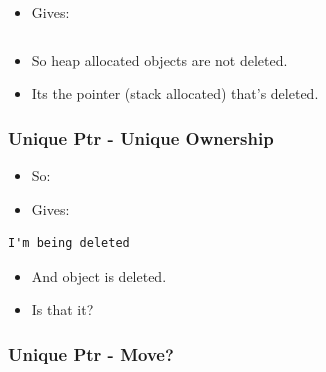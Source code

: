 \begin{itemize}
\itemsep1pt\parskip0pt
\item
  Gives:
\end{itemize}

\begin{verbatim}
\end{verbatim}

\begin{itemize}
\itemsep1pt\parskip0pt
\item
  So heap allocated objects are not deleted.
\item
  Its the pointer (stack allocated) that's deleted.
\end{itemize}

\subsubsection{Unique Ptr - Unique
Ownership}\label{unique-ptr---unique-ownership}

\begin{itemize}
\itemsep1pt\parskip0pt
\item
  So:
\end{itemize}

\begin{Shaded}
\begin{Highlighting}[]
 
   \NormalTok{,}\NormalTok{));}
\NormalTok{\}}

\end{Highlighting}
\end{Shaded}

\begin{itemize}
\itemsep1pt\parskip0pt
\item
  Gives:
\end{itemize}

\begin{verbatim}
I'm being deleted
\end{verbatim}

\begin{itemize}
\itemsep1pt\parskip0pt
\item
  And object is deleted.
\item
  Is that it?
\end{itemize}

\subsubsection{Unique Ptr - Move?}\label{unique-ptr---move}

